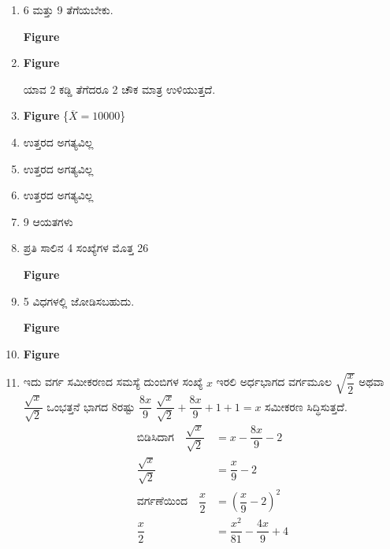 \begin{enumerate}
\item 6 ಮತ್ತು 9 ತೆಗೆಯಬೇಕು. 
\begin{center}
{\bf Figure}
\end{center}

\item 
\begin{center}
{\bf Figure}
\end{center}

ಯಾವ 2 ಕಡ್ಡಿ ತೆಗೆದರೂ 2 ಚೌಕ ಮಾತ್ರ ಉಳಿಯುತ್ತದೆ.

\item 
\begin{center}
{\bf Figure}
\{$\overline{X} = 10000$\}
\end{center}

\item ಉತ್ತರದ ಅಗತ್ಯವಿಲ್ಲ 

\item ಉತ್ತರದ ಅಗತ್ಯವಿಲ್ಲ 

\item ಉತ್ತರದ ಅಗತ್ಯವಿಲ್ಲ 

\item 9 ಆಯತಗಳು 

\item ಪ್ರತಿ ಸಾಲಿನ 4 ಸಂಖ್ಯೆಗಳ ಮೊತ್ತ  26
\begin{center}
{\bf Figure}
\end{center}

\item 5 ವಿಧಗಳಲ್ಲಿ ಜೋಡಿಸಬಹುದು.
\begin{center}
{\bf Figure}
\end{center}

\item 
\begin{center}
{\bf Figure}
\end{center}

\item ಇದು ವರ್ಗ ಸಮೀಕರಣದ ಸಮಸ್ಯೆ ದುಂಬಿಗಳ ಸಂಖ್ಯೆ  $x$ ಇರಲಿ ಅರ್ಧಭಾಗದ ವರ್ಗಮೂಲ $\sqrt{\dfrac{x}{2}}$ ಅಥವಾ $\dfrac{\sqrt{x}}{\sqrt{2}}$ ಒಂಭತ್ತನೆ ಭಾಗದ 8ರಷ್ಟು $\dfrac{8x}{9}$ $\dfrac{\sqrt{x}}{\sqrt{2}} + \dfrac{8x}{9} + 1 + 1 = x$ ಸಮೀಕರಣ ಸಿದ್ಧಿಸುತ್ತದೆ. 
\begin{align*}
\text{ಬಿಡಿಸಿದಾಗ}\quad \dfrac{\sqrt{x}}{\sqrt{2}} & = x - \dfrac{8x}{9} - 2\\
\dfrac{\sqrt{x}}{\sqrt{2}} & = \dfrac{x}{9} - 2\\
\text{ವರ್ಗಣೆಯಿಂದ}\quad \dfrac{x}{2} & = \left(\dfrac{x}{9} - 2\right)^{2}\\
\dfrac{x}{2} & = \dfrac{x^{2}}{81} - \dfrac{4x}{9} + 4\\
\end{align*}


\end{enumerate}
